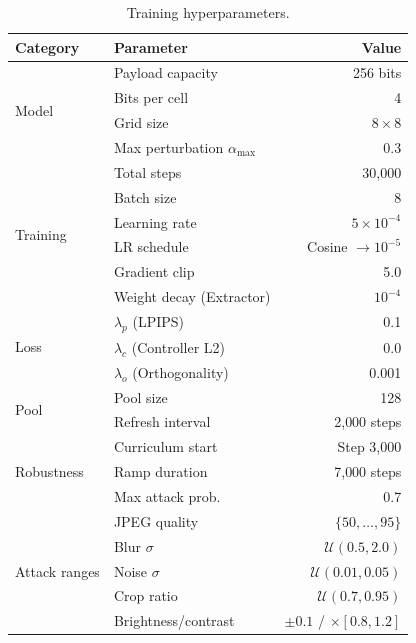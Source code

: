 \documentclass[10pt, twocolumn]{article}
\newcommand{\Ucal}{\mathcal{U}}
\begin{document}
\begin{table}[t]
\centering
\caption{Training hyperparameters.}
\label{tab:hyperparams}
\small
\begin{tabular}{@{}llr@{}}
\toprule
\textbf{Category} & \textbf{Parameter} & \textbf{Value} \\
\midrule
\multirow{4}{*}{Model}
    & Payload capacity & 256 bits \\
    & Bits per cell & 4 \\
    & Grid size & $8 \times 8$ \\
    & Max perturbation $\alpha_\text{max}$ & 0.3 \\
\midrule
\multirow{6}{*}{Training}
    & Total steps & 30{,}000 \\
    & Batch size & 8 \\
    & Learning rate & $5 \times 10^{-4}$ \\
    & LR schedule & Cosine $\to 10^{-5}$ \\
    & Gradient clip & 5.0 \\
    & Weight decay (Extractor) & $10^{-4}$ \\
\midrule
\multirow{3}{*}{Loss}
    & $\lambda_p$ (LPIPS) & 0.1 \\
    & $\lambda_c$ (Controller L2) & 0.0 \\
    & $\lambda_o$ (Orthogonality) & 0.001 \\
\midrule
\multirow{2}{*}{Pool}
    & Pool size & 128 \\
    & Refresh interval & 2{,}000 steps \\
\midrule
\multirow{3}{*}{Robustness}
    & Curriculum start & Step 3{,}000 \\
    & Ramp duration & 7{,}000 steps \\
    & Max attack prob. & 0.7 \\
\midrule
\multirow{5}{*}{Attack ranges}
    & JPEG quality & $\{50, \ldots, 95\}$ \\
    & Blur $\sigma$ & $\Ucal(0.5, 2.0)$ \\
    & Noise $\sigma$ & $\Ucal(0.01, 0.05)$ \\
    & Crop ratio & $\Ucal(0.7, 0.95)$ \\
    & Brightness/contrast & $\pm 0.1$ / $\times[0.8, 1.2]$ \\
\bottomrule
\end{tabular}
\end{table}
\end{document}
